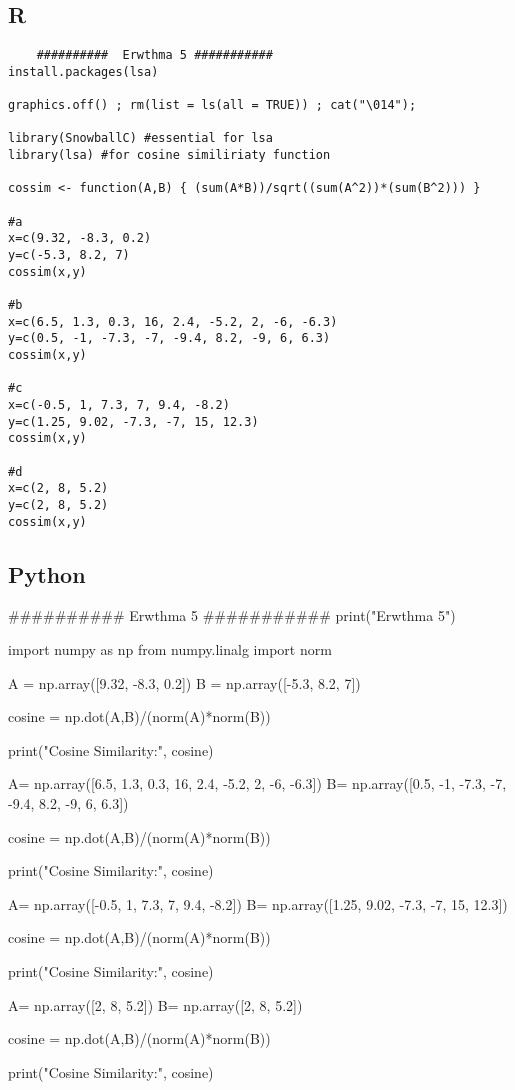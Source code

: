\documentclass[10pt,towside,a4paper]{article}
\begin{document}
\subsection{R}
\begin{lstlisting}
	##########  Erwthma 5 ###########
install.packages(lsa)
	
graphics.off() ; rm(list = ls(all = TRUE)) ; cat("\014");
	
library(SnowballC) #essential for lsa
library(lsa) #for cosine similiriaty function
	
cossim <- function(A,B) { (sum(A*B))/sqrt((sum(A^2))*(sum(B^2))) }
	
#a
x=c(9.32, -8.3, 0.2)
y=c(-5.3, 8.2, 7)
cossim(x,y)
	
#b
x=c(6.5, 1.3, 0.3, 16, 2.4, -5.2, 2, -6, -6.3)
y=c(0.5, -1, -7.3, -7, -9.4, 8.2, -9, 6, 6.3)
cossim(x,y)
	
#c
x=c(-0.5, 1, 7.3, 7, 9.4, -8.2)
y=c(1.25, 9.02, -7.3, -7, 15, 12.3)
cossim(x,y)
	
#d
x=c(2, 8, 5.2)
y=c(2, 8, 5.2)
cossim(x,y)
\end{lstlisting}
\subsection{Python}
\begin{python}
	
	##########  Erwthma 5 ###########
	print("Erwthma 5")
	
	import numpy as np
	from numpy.linalg import norm
	
	
	A = np.array([9.32, -8.3, 0.2])
	B = np.array([-5.3, 8.2, 7])
	
	cosine = np.dot(A,B)/(norm(A)*norm(B))
	
	print("Cosine Similarity:", cosine)
	
	A= np.array([6.5, 1.3, 0.3, 16, 2.4, -5.2, 2, -6, -6.3])
	B= np.array([0.5, -1, -7.3, -7, -9.4, 8.2, -9, 6, 6.3])
	
	cosine = np.dot(A,B)/(norm(A)*norm(B))
	
	print("Cosine Similarity:", cosine)
	
	A= np.array([-0.5, 1, 7.3, 7, 9.4, -8.2])
	B= np.array([1.25, 9.02, -7.3, -7, 15, 12.3])
	
	cosine = np.dot(A,B)/(norm(A)*norm(B))
	
	print("Cosine Similarity:", cosine)
	
	A= np.array([2, 8, 5.2])
	B= np.array([2, 8, 5.2])
	
	cosine = np.dot(A,B)/(norm(A)*norm(B))
	
	print("Cosine Similarity:", cosine)
\end{python}
\newpage
\end{document}
